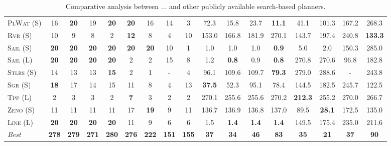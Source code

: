 \begin{table}[tb]
{\begin{tabular}{|l||cccccccc||cccccccc||}
\textsc{PlWat} (S)&16&\textbf{20}&19&\textbf{20}&\textbf{20}&16&14&3&72.3&15.8&23.7&\textbf{11.1}&41.1&101.3&167.2&268.3\\
\textsc{Rvr} (S)&10&9&8&2&\textbf{12}&8&4&10&153.0&166.8&181.9&270.1&143.7&197.4&240.8&\textbf{133.3}\\
\textsc{Sail} (S)&\textbf{20}&\textbf{20}&\textbf{20}&\textbf{20}&\textbf{20}&\textbf{20}&10&1&1.0&1.0&1.0&\textbf{0.9}&5.0&2.0&150.3&285.0\\
\textsc{Sail} (L)&\textbf{20}&\textbf{20}&\textbf{20}&\textbf{20}&2&2&15&8&1.2&\textbf{0.8}&0.9&\textbf{0.8}&270.8&270.6&96.8&182.8\\
\textsc{Stlrs} (S)&14&13&13&\textbf{15}&2&1&-&4&96.1&109.6&109.7&\textbf{79.3}&279.0&288.6&-&243.8\\
\textsc{Sgr} (S)&\textbf{18}&17&14&15&11&8&4&13&\textbf{37.5}&52.3&95.1&78.4&144.5&182.5&245.7&122.5\\
\textsc{Tpp} (L)&2&3&3&2&\textbf{7}&3&2&2&270.1&255.6&255.6&270.2&\textbf{212.3}&255.2&270.0&266.7\\
\textsc{Zeno} (S)&11&11&11&11&17&\textbf{19}&9&11&136.7&136.9&136.8&137.0&89.5&\textbf{28.1}&172.5&135.0\\
\textsc{Line} (L)&\textbf{20}&\textbf{20}&\textbf{20}&\textbf{20}&11&9&6&6&1.5&\textbf{1.4}&\textbf{1.4}&\textbf{1.4}&149.5&175.4&235.0&211.6
\\\hline
\textit{Best}&\textbf{278}&\textbf{279}&\textbf{271}&\textbf{280}&\textbf{276}&\textbf{222}&\textbf{151}&\textbf{155}&\textbf{37}&\textbf{34}&\textbf{46}&\textbf{83}&\textbf{35}&\textbf{21}&\textbf{37}&\textbf{90}\\\hline

        \end{tabular}}
        \caption{Comparative analysis between ... and other publicly available search-based planners.}
        \label{tab:search}
        \end{table}
        